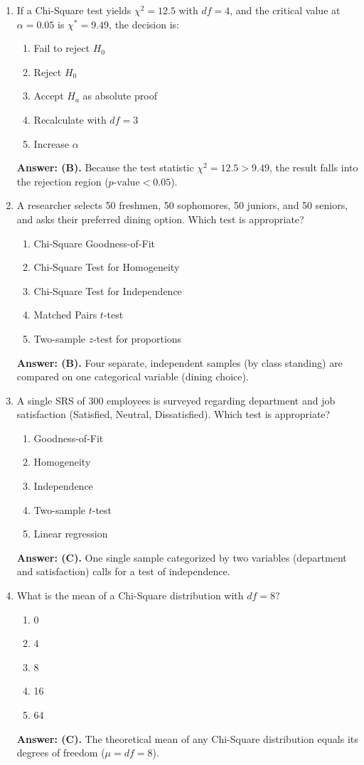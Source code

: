 \begin{enumerate}[leftmargin=1.5em]
  \item If a Chi-Square test yields $\chi^2 = 12.5$ with $df = 4$, and the critical value at $\alpha = 0.05$ is $\chi^* = 9.49$, the decision is:
  \begin{enumerate}[label=(\Alph*)]
    \item Fail to reject $H_0$ \item Reject $H_0$ \item Accept $H_a$ as absolute proof \item Recalculate with $df = 3$ \item Increase $\alpha$
  \end{enumerate}
  \textbf{Answer: (B).} Because the test statistic $\chi^2 = 12.5 > 9.49$, the result falls into the rejection region ($p\text{-value} < 0.05$).

  \item A researcher selects 50 freshmen, 50 sophomores, 50 juniors, and 50 seniors, and asks their preferred dining option. Which test is appropriate?
  \begin{enumerate}[label=(\Alph*)]
    \item Chi-Square Goodness-of-Fit \item Chi-Square Test for Homogeneity \item Chi-Square Test for Independence \item Matched Pairs $t$-test \item Two-sample $z$-test for proportions
  \end{enumerate}
  \textbf{Answer: (B).} Four separate, independent samples (by class standing) are compared on one categorical variable (dining choice).

  \item A single SRS of 300 employees is surveyed regarding department and job satisfaction (Satisfied, Neutral, Dissatisfied). Which test is appropriate?
  \begin{enumerate}[label=(\Alph*)]
    \item Goodness-of-Fit \item Homogeneity \item Independence \item Two-sample $t$-test \item Linear regression
  \end{enumerate}
  \textbf{Answer: (C).} One single sample categorized by two variables (department and satisfaction) calls for a test of independence.

  \item What is the mean of a Chi-Square distribution with $df = 8$?
  \begin{enumerate}[label=(\Alph*)]
    \item 0 \item 4 \item 8 \item 16 \item 64
  \end{enumerate}
  \textbf{Answer: (C).} The theoretical mean of any Chi-Square distribution equals its degrees of freedom ($\mu = df = 8$).


\end{enumerate}
